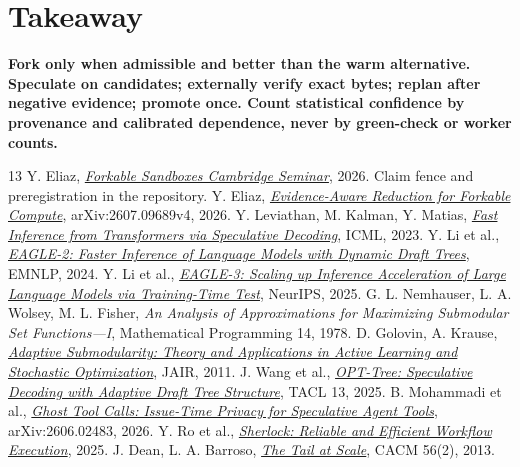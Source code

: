 \documentclass[10pt,twocolumn]{article}
\newcommand{\1}{\mathbf{1}}
\begin{document}
\section*{Takeaway}
\noindent\colorbox{faint}{\parbox{0.94\columnwidth}{\vspace{4pt}\small\textbf{Fork only when admissible and better than the warm alternative.\newline
Speculate on candidates; externally verify exact bytes; replan after negative evidence; promote once. Count statistical confidence by provenance and calibrated dependence, never by green-check or worker counts.}\vspace{4pt}}}

\balance
\begin{thebibliography}{13}\footnotesize\setlength{\itemsep}{1pt}
 Y. Eliaz, \href{https://github.com/zozo123/cam-talk-london-26}{\emph{Forkable Sandboxes Cambridge Seminar}}, 2026. Claim fence and preregistration in the repository.
 Y. Eliaz, \href{https://arxiv.org/abs/2607.09689}{\emph{Evidence-Aware Reduction for Forkable Compute}}, arXiv:2607.09689v4, 2026.
 Y. Leviathan, M. Kalman, Y. Matias, \href{https://proceedings.mlr.press/v202/leviathan23a.html}{\emph{Fast Inference from Transformers via Speculative Decoding}}, ICML, 2023.
 Y. Li et al., \href{https://aclanthology.org/2024.emnlp-main.422/}{\emph{EAGLE-2: Faster Inference of Language Models with Dynamic Draft Trees}}, EMNLP, 2024.
 Y. Li et al., \href{https://papers.neurips.cc/paper_files/paper/2025/hash/c7b5a35ea98b62512a869c19ea7b03cb-Abstract-Conference.html}{\emph{EAGLE-3: Scaling up Inference Acceleration of Large Language Models via Training-Time Test}}, NeurIPS, 2025.
 G. L. Nemhauser, L. A. Wolsey, M. L. Fisher, \emph{An Analysis of Approximations for Maximizing Submodular Set Functions---I}, Mathematical Programming 14, 1978.
 D. Golovin, A. Krause, \href{https://arxiv.org/abs/1003.3967}{\emph{Adaptive Submodularity: Theory and Applications in Active Learning and Stochastic Optimization}}, JAIR, 2011.
 J. Wang et al., \href{https://aclanthology.org/2025.tacl-1.8/}{\emph{OPT-Tree: Speculative Decoding with Adaptive Draft Tree Structure}}, TACL 13, 2025.
 B. Mohammadi et al., \href{https://arxiv.org/abs/2606.02483}{\emph{Ghost Tool Calls: Issue-Time Privacy for Speculative Agent Tools}}, arXiv:2606.02483, 2026.
 Y. Ro et al., \href{https://www.microsoft.com/en-us/research/publication/sherlock-reliable-and-efficient-workflow-execution/}{\emph{Sherlock: Reliable and Efficient Workflow Execution}}, 2025.
 J. Dean, L. A. Barroso, \href{https://research.google/pubs/the-tail-at-scale/}{\emph{The Tail at Scale}}, CACM 56(2), 2013.
\end{thebibliography}
\end{document}
